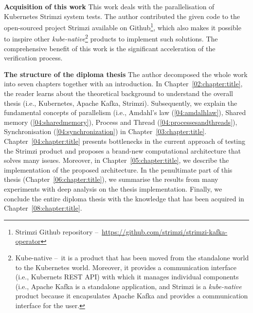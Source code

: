 \textbf{Acquisition of this work} \quad This work deals with the parallelisation of Kubernetes Strimzi system tests.
The author contributed the given code to the open-sourced project Strimzi available on Github\footnote{Strimzi Github repository \---\ \url{https://github.com/strimzi/strimzi-kafka-operator}}, which also makes it possible to inspire other \emph{kube-native}\footnote{Kube-native \---\ it is a product that has been moved from the standalone world to the Kubernetes world. Moreover, it provides a communication interface (i.e., Kubernets REST API) with which it manages individual components (i.e., Apache Kafka is a standalone application, and Strimzi is a \emph{kube-native} product because it encapsulates Apache Kafka and provides a communication interface for the user.} products to implement such solutions.
The comprehensive benefit of this work is the significant acceleration of the verification process.
\bigskip

\textbf{The structure of the diploma thesis} \quad The author decomposed the whole work into seven chapters together with an introduction.
In Chapter~\ref{02:chapter:title}, the reader learns about the theoretical background to understand the overall thesis (i.e., Kubernetes, Apache Kafka, Strimzi).
Subsequently, we explain the fundamental concepts of parallelism (i.e., Amdahl's law (\ref{04:amdalhlaw}), Shared memory (\ref{04:sharedmemory}), Process and Thread (\ref{04:processesandthreads}), Synchronisation (\ref{04:synchronization}) in Chapter~\ref{03:chapter:title}.
Chapter~\ref{04:chapter:title} presents bottlenecks in the current approach of testing the Strimzi product and proposes a brand-new computational architecture that solves many issues.
Moreover, in Chapter~\ref{05:chapter:title}, we describe the implementation of the proposed architecture.
In the penultimate part of this thesis (Chapter~\ref{06:chapter:title}), we summarise the results from many experiments with deep analysis on the thesis implementation.
Finally, we conclude the entire diploma thesis with the knowledge that has been acquired in Chapter~\ref{08:chapter:title}.